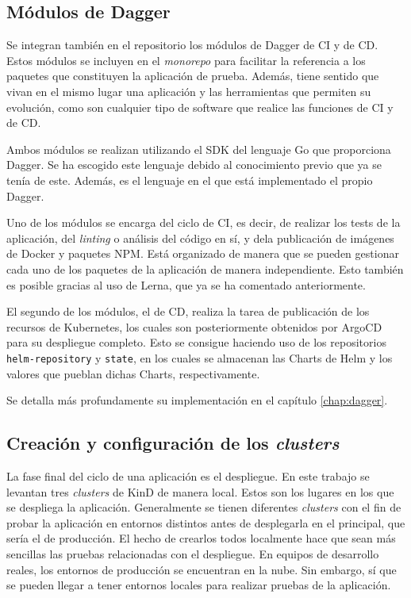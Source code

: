 \subsection*{Módulos de Dagger}

Se integran también en el repositorio los módulos de Dagger de CI y de CD. Estos módulos se incluyen en el \textit{monorepo} para facilitar la referencia a los paquetes que constituyen la aplicación de prueba. Además, tiene sentido que vivan en el mismo lugar una aplicación y las herramientas que permiten su evolución, como son cualquier tipo de software que realice las funciones de CI y de CD.

Ambos módulos se realizan utilizando el SDK del lenguaje Go que proporciona Dagger. Se ha escogido este lenguaje debido al conocimiento previo que ya se tenía de este. Además, es el lenguaje en el que está implementado el propio Dagger.

Uno de los módulos se encarga del ciclo de CI, es decir, de realizar los tests de la aplicación, del \textit{linting} o análisis del código en sí, y dela publicación de imágenes de Docker y paquetes NPM. Está organizado de manera que se pueden gestionar cada uno de los paquetes de la aplicación de manera independiente. Esto también es posible gracias al uso de Lerna, que ya se ha comentado anteriormente.

El segundo de los módulos, el de CD, realiza la tarea de publicación de los recursos de Kubernetes, los cuales son posteriormente obtenidos por ArgoCD para su despliegue completo. Esto se consigue haciendo uso de los repositorios \texttt{helm-repository} y \texttt{state}, en los cuales se almacenan las Charts de Helm y los valores que pueblan dichas Charts, respectivamente.

Se detalla más profundamente su implementación en el capítulo \ref{chap:dagger}.

\subsection*{Creación y configuración de los \textit{clusters}}
\label{subsec:clusters}

La fase final del ciclo de una aplicación es el despliegue. En este trabajo se levantan tres \textit{clusters} de KinD de manera local. Estos son los lugares en los que se despliega la aplicación. Generalmente se tienen diferentes \textit{clusters} con el fin de probar la aplicación en entornos distintos antes de desplegarla en el principal, que sería el de producción. El hecho de crearlos todos localmente hace que sean más sencillas las pruebas relacionadas con el despliegue. En equipos de desarrollo reales, los entornos de producción se encuentran en la nube. Sin embargo, sí que se pueden llegar a tener entornos locales para realizar pruebas de la aplicación.

